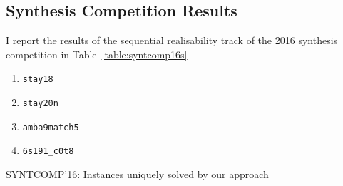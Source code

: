 \subsection{Synthesis Competition Results}

I report the results of the sequential realisability track of the 2016 synthesis competition in Table~\ref{table:syntcomp16s}

\begin{table}
    \caption{SYNTCOMP'16: sequential realisability track}
    \label{table:syntcomp16s}
\end{table}

\begin{table}
    \centering
    \begin{enumerate}
        \item \texttt{stay18}
        \item \texttt{stay20n}
        \item \texttt{amba9match5}
        \item \texttt{6s191\_c0t8}
    \end{enumerate}
    \caption{SYNTCOMP'16: Instances uniquely solved by our approach}
    \label{tab:synt16unique}
\end{table}


